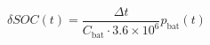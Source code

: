 \begin{equation}
	\delta SOC(t) = \frac{\Delta t}{C_\text{bat}\cdot3.6\times10^6}p_\text{bat}(t)
	\label{ch2:equ:soc-equation-from-battery-power}
\end{equation}